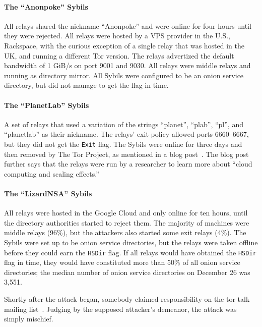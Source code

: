 \paragraph{The ``Anonpoke'' Sybils}
All relays shared the nickname ``Anonpoke'' and were online for four hours until
they were rejected.  All relays were hosted by a VPS provider in the U.S.,
Rackspace, with the curious exception of a single relay that was hosted in the
UK, and running a different Tor version.  The relays advertized the default
bandwidth of 1 GiB/s on port 9001 and 9030.  All relays were middle relays and
running as directory mirror.  All Sybils were configured to be an onion service
directory, but did not manage to get the flag in time.

\paragraph{The ``PlanetLab'' Sybils}
A set of relays that used a variation of the strings ``planet'', ``plab'',
``pl'', and ``planetlab'' as their nickname.  The relays' exit policy allowed
ports 6660--6667, but they did not get the \texttt{Exit} flag.  The Sybils were
online for three days and then removed by The Tor Project, as mentioned in a
blog post~\cite{progressreport}.  The blog post further says that the relays
were run by a researcher to learn more about ``cloud computing and scaling
effects.''

\paragraph{The ``LizardNSA'' Sybils}
All relays were hosted in the Google Cloud and only online for ten hours, until
the directory authorities started to reject them.  The majority of machines were
middle relays (96\%), but the attackers also started some exit relays (4\%).
The Sybils were set up to be onion service directories, but the relays were
taken offline before they could earn the \texttt{HSDir} flag.  If all relays
would have obtained the \texttt{HSDir} flag in time, they would have constituted
more than 50\% of all onion service directories; the median number of onion
service directories on December 26 was 3,551.

Shortly after the attack began, somebody claimed responsibility on the tor-talk
mailing list~\cite{lizards}.  Judging by the supposed attacker's demeanor, the
attack was simply mischief.

